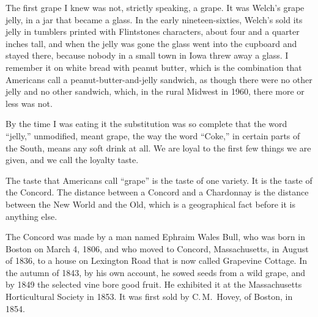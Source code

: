 The first grape I knew was not, strictly speaking, a grape. It was Welch's
grape jelly, in a jar that became a glass. In the early
nineteen-sixties, Welch's sold its jelly in tumblers printed with
Flintstones characters, about four and a quarter inches tall, and when the
jelly was gone the glass went into the cupboard and stayed there, because
nobody in a small town in Iowa threw away a glass. I remember it on white
bread with peanut butter, which is the combination that Americans call a
peanut-butter-and-jelly sandwich, as though there were no other jelly and
no other sandwich, which, in the rural Midwest in 1960, there more or less
was not.

 By the time I was eating it
the substitution was so complete that the word ``jelly,'' unmodified, meant
grape, the way the word ``Coke,'' in certain parts of the South, means any
soft drink at all. We are loyal to the first few things we are given, and
we call the loyalty taste.

The taste that Americans call ``grape'' is the taste of one
variety. It is the taste of the Concord. The distance
between a Concord and a Chardonnay is the distance between the New World
and the Old, which is a geographical fact before it is anything else.

The Concord was made by a man named Ephraim Wales Bull, who was born in
Boston on March 4, 1806, and who moved to Concord, Massachusetts, in
August of 1836, to a house on Lexington Road that is now called Grapevine
Cottage. In the autumn of 1843, by his own account, he sowed seeds from a
wild grape, and by 1849 the selected vine bore good fruit. He exhibited it
at the Massachusetts Horticultural Society in 1853. It was first sold by
C.\,M.~Hovey, of Boston, in 1854.

